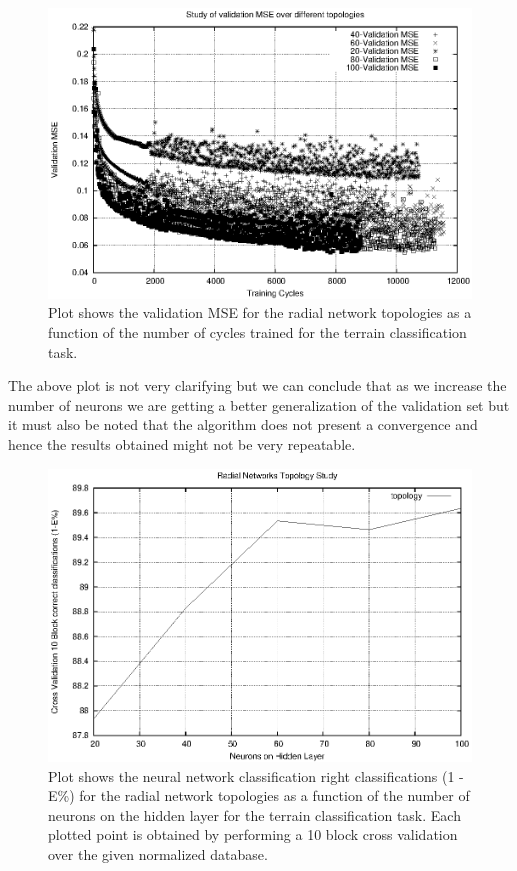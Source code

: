 \documentclass[a4paper,10pt,titlepage]{article}
\begin{document}
\begin{figure}[H]
	\centerline{%
	\includegraphics[]{validation_mse_rr.eps}
	}
	\caption[Terrain classification task: Topology study for radial networks - Validation MSE]{Plot shows the validation MSE for the radial network topologies as a function of the number of cycles trained for the  terrain classification task.}
\end{figure}

\par The above plot is not very clarifying but we can conclude that as we increase the number of neurons we are getting a better generalization of the validation set but it must also be noted that the algorithm does not present a convergence and hence the results obtained might not be very repeatable. 

\begin{figure}[H]
	\centerline{%
	\includegraphics[]{radial_topology.eps}
	}
	\caption[Terrain classification task: Topology study for radial networks - correct classification]{Plot shows the neural network classification right classifications (1 - E\%) for the radial network topologies as a function of the number of neurons on the hidden layer for the  terrain classification task. Each plotted point is obtained by performing a 10 block cross validation over the given normalized database.}
\end{figure}
\end{document}
